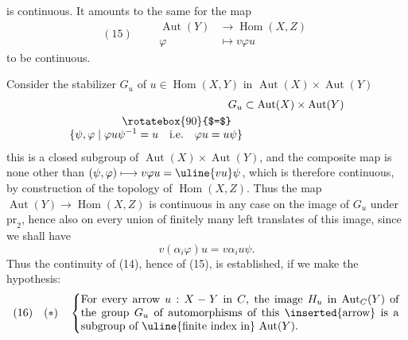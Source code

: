 is continuous. It amounts to the same for the map
\[
(15)\qquad\begin{aligned}
\operatorname{Aut}(Y)&\longrightarrow\operatorname{Hom}(X,Z)\\
\varphi&\longmapsto v\varphi u
\end{aligned}
\]
to be continuous.

Consider  the stabilizer 
$G_u$ of $u\in\operatorname{Hom}(X,Y)$ in $\operatorname{Aut}(X)\times\operatorname{Aut}(Y)$
\[
\begin{aligned}
G_u&\subset\operatorname{Aut}(X)\times\operatorname{Aut}(Y)\\
\rotatebox{90}{$=$}\quad&\\[-1ex]
\{\psi,\varphi\mid\varphi u\psi^{-1}=u\quad\text{i.e.}\quad\varphi u=u\psi\}&
\end{aligned}
\]
this is a closed subgroup of $\operatorname{Aut}(X)\times\operatorname{Aut}(Y)$,
and the composite map
is none other than $(\psi,\varphi)\longmapsto v\varphi u=\uline{vu}\psi$, which is
therefore continuous, by construction of the topology of
$\operatorname{Hom}(X,Z)$. Thus the map $\operatorname{Aut}(Y)\longrightarrow\operatorname{Hom}(X,Z)$
is continuous in any case on the image  of $G_u$
under $\mathrm{pr}_2$,  hence also on every union
of finitely many left translates  of this image,
since we shall have 
\[
v(\alpha_i\varphi)u=v\alpha_i u\psi.
\]
Thus the continuity of (14), hence of (15), is
established, if we make the hypothesis:
\[
(16)\quad(*)\quad\left\{
\begin{minipage}{0.83\linewidth}
For every arrow $u:X\mathbin{-}Y$ in $C$, the image
$H_u$ in $\operatorname{Aut}_C(Y)$ of the group $G_u$ of automorphisms of this
\inserted{arrow} is a subgroup of \uline{finite index in}
$\operatorname{Aut}(Y)$.
\end{minipage}\right.
\]
